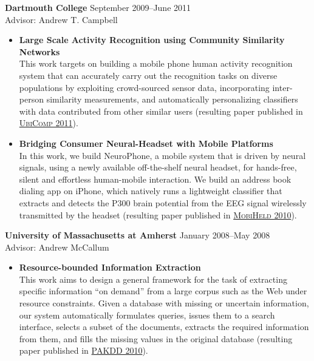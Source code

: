 {\bf Dartmouth College} \hfill September 2009--June 2011\\
Advisor: Andrew T. Campbell 
\begin{itemize}
	\item \textbf{Large Scale Activity Recognition using Community Similarity Networks} \\
	This work targets on building a mobile phone human activity recognition system that can accurately carry out the recognition tasks on diverse populations by exploiting crowd-sourced sensor data, incorporating inter-person similarity measurements, and automatically personalizing classifiers with data contributed from other similar users (resulting paper published in \hyperlink{lane2011ubicomp}{\textsc{UbiComp 2011}}).
	
	\item \textbf{Bridging Consumer Neural-Headset with Mobile Platforms} \\
	In this work, we build NeuroPhone, a mobile system that is driven by neural signals, using a newly available off-the-shelf neural headset, for hands-free, silent and effortless human-mobile interaction. We build an address book dialing app on iPhone, which natively runs a lightweight classifier that extracts and detects the P300 brain potential from the EEG signal wirelessly transmitted by the headset (resulting paper published in \hyperlink{campbell2010mobiheld}{\textsc{MobiHeld 2010}}). 
\end{itemize}

{\bf University of Massachusetts at Amherst} \hfill January 2008--May 2008 \\
Advisor: Andrew McCallum 
\begin{itemize}
	\item \textbf{Resource-bounded Information Extraction} \\
	This work aims to design a general framework for the task of extracting specific information ``on demand'' from a large corpus such as the Web under resource constraints. Given a database with missing or uncertain information, our system automatically formulates queries, issues them to a search interface, selects a subset of the documents, extracts the required information from them, and fills the missing values in the original database (resulting paper published in \hyperlink{kanani2010pakdd}{\textsc{PAKDD 2010}}). 
\end{itemize}
